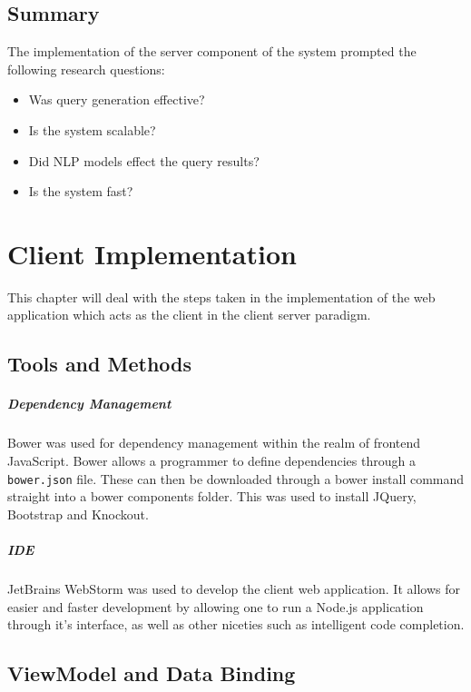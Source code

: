 \documentclass{l4proj}
\newcommand{\code}[1]{\texttt{#1}}
\begin{document}
\section{Summary} \label{serversummary}
The implementation of the server component of the system prompted the following research questions:
\begin{itemize}
\item Was query generation effective?
\item Is the system scalable?
\item Did NLP models effect the query results?
\item Is the system fast?
\end{itemize}

\chapter{Client Implementation} \label{clientimplementation}
This chapter will deal with the steps taken in the implementation of the web application which acts as the client in the client server paradigm.

\section{Tools and Methods}
\paragraph{Dependency Management}
Bower was used for dependency management within the realm of frontend JavaScript. Bower allows a programmer to define dependencies through a \code{bower.json} file. These can then be downloaded through a bower install command straight into a bower components folder. This was used to install JQuery, Bootstrap and Knockout.

\paragraph{IDE}
JetBrains WebStorm was used to develop the client web application. It allows for easier and faster development by allowing one to run a Node.js application through it's interface, as well as other niceties such as intelligent code completion.

\section{ViewModel and Data Binding} \label{viewmodels}
\end{document}
